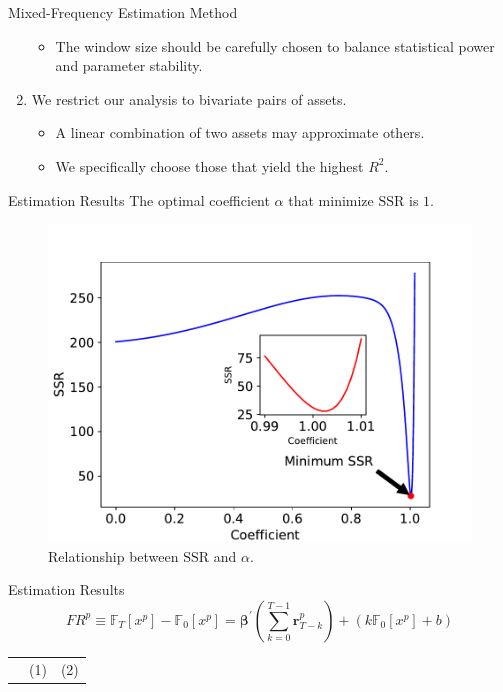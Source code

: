 \documentclass[UTF8, 10pt]{beamer}
\begin{document}
\begin{CJK*}{UTF8}{gbsn}
\begin{frame}{Mixed-Frequency Estimation Method}
\begin{enumerate}
\begin{itemize}
				\item The window size should be carefully chosen to balance statistical power and parameter stability.
			\end{itemize}
		\item We restrict our analysis to \alert{bivariate pairs of assets}.
			\begin{itemize}
				\item A linear combination of two assets may approximate others.
				\item We specifically choose those that yield the highest $R^2$.
			\end{itemize}
	\end{enumerate}
\end{frame}
\begin{frame}{Estimation Results}
	\center The optimal coefficient $\alpha$ that minimize $\mathrm{SSR}$ is $1$.
	\begin{figure}[htpb]
	  \begin{center}
	    \includegraphics[width=0.7 \linewidth]
	    {pic/Figure_1.pdf}
	    \caption{Relationship between $\mathrm{SSR}$ and $\alpha$.}
	  \end{center}
	\end{figure}
\end{frame}
\begin{frame}{Estimation Results}
	$$
	FR^p \equiv
    \mathbb{F}_{T}\left[x^p\right] - \mathbb{F}_{0}\left[x^p\right]
    = \boldsymbol{\beta}^{\prime} (\sum_{k=0}^{T-1} \mathbf{r}_{T-k}^p)
    + (k \mathbb{F}_{0}\left[x^p\right] + b)
	$$
	\begin{table}[H]
    \centering
    \label{Table4}
        \begin{tabular}{l c c}
            \toprule
             & (1)& (2)\\

\end{tabular}
\end{table}
\end{frame}
\end{CJK*}
\end{document}
